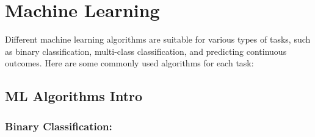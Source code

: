 \documentclass[
]{book}
\begin{document}
\hypertarget{machine-learning}{%
\chapter{Machine Learning}\label{machine-learning}}

Different machine learning algorithms are suitable for various types of tasks, such as binary classification, multi-class classification, and predicting continuous outcomes. Here are some commonly used algorithms for each task:

\hypertarget{ml-algorithms-intro}{%
\section{ML Algorithms Intro}\label{ml-algorithms-intro}}

\hypertarget{binary-classification}{%
\subsection{Binary Classification:}\label{binary-classification}}
\end{document}
